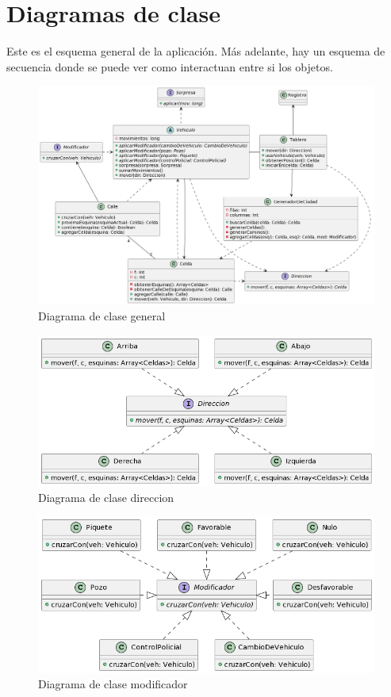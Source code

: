 \documentclass[titlepage,a4paper]{article}
\begin{document}
\section{Diagramas de clase}\label{sec:diagramasdeclase}

Este es el esquema general de la aplicación. Más adelante, hay un esquema de secuencia donde se puede ver como interactuan entre si los objetos.


\begin{figure}[H]
  \centering
  \includegraphics[width=1\textwidth]{diagramas/modelo.png}
  \caption{\label{fig:seq01} Diagrama de clase general}
\end{figure}

\begin{figure}[H]
  \centering
  \includegraphics[width=1\textwidth]{diagramas/direcciones.png}
  \caption{\label{fig:seq02} Diagrama de clase direccion}
\end{figure}

\begin{figure}[H]
  \centering
  \includegraphics[width=1\textwidth]{diagramas/modificadores.png}
  \caption{\label{fig:seq03} Diagrama de clase modificador}
\end{figure}
\end{document}
